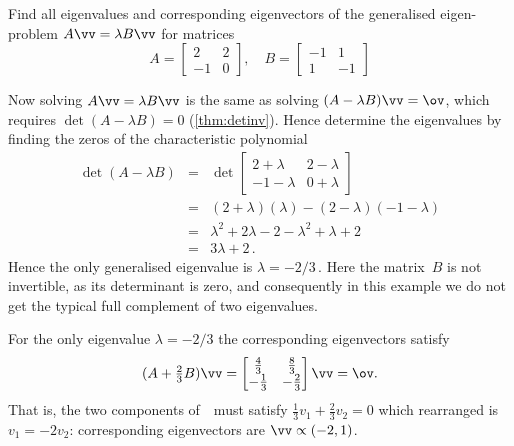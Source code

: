 \begin{example} \label{eg:}
Find all eigenvalues and corresponding eigenvectors of the generalised eigen-problem \(A\vv=\lambda B\vv\) for matrices
\begin{equation*}
A=\begin{bmatrix} 2&2\\-1&0 \end{bmatrix},\quad
B=\begin{bmatrix} -1&1\\1&-1 \end{bmatrix}
\end{equation*}
\begin{solution} 
Now solving \(A\vv=\lambda B\vv\) is the same as solving \((A-\lambda B)\vv=\ov\), which requires \(\det(A-\lambda B)=0\) (\autoref{thm:detinv}).
Hence determine the eigenvalues by finding the zeros of the characteristic polynomial
\begin{eqnarray*}
\det(A-\lambda B)
&=&\det\begin{bmatrix} 2+\lambda&2-\lambda\\-1-\lambda&0+\lambda \end{bmatrix}
\\&=&(2+\lambda)(\lambda)-(2-\lambda)(-1-\lambda)
\\&=&\lambda^2+2\lambda-2-\lambda^2+\lambda+2
\\&=&3\lambda+2\,.
\end{eqnarray*}
Hence the only generalised eigenvalue is \(\lambda=-2/3\)\,.
Here the matrix~\(B\) is not invertible, as its determinant is zero, and consequently in this example we do not get the typical full complement of two eigenvalues.

For the only eigenvalue \(\lambda=-2/3\) the corresponding eigenvectors satisfy
\begin{equation*}
(A+\tfrac23B)\vv=\begin{bmatrix} \tfrac43&\tfrac83\\-\tfrac13&-\tfrac23 \end{bmatrix}\vv=\ov.
\end{equation*}
That is, the two components of~\vv\ must satisfy \(\tfrac13v_1+\tfrac23v_2=0\) which rearranged is \(v_1=-2v_2\): corresponding eigenvectors are \(\vv\propto(-2,1)\).
\end{solution}
\end{example}





